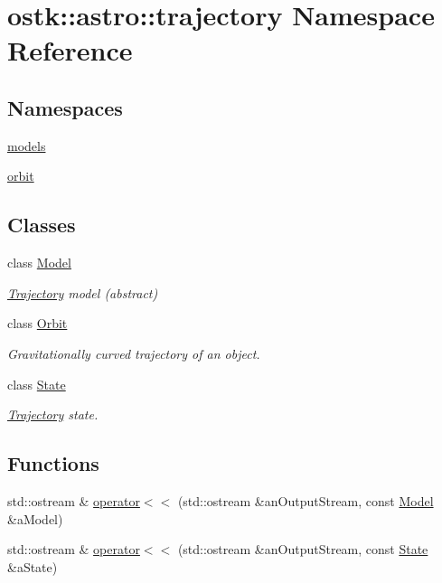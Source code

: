\hypertarget{namespaceostk_1_1astro_1_1trajectory}{}\section{ostk\+:\+:astro\+:\+:trajectory Namespace Reference}
\label{namespaceostk_1_1astro_1_1trajectory}
\subsection*{Namespaces}
\begin{DoxyCompactItemize}
\item 
 \hyperlink{namespaceostk_1_1astro_1_1trajectory_1_1models}{models}
\item 
 \hyperlink{namespaceostk_1_1astro_1_1trajectory_1_1orbit}{orbit}
\end{DoxyCompactItemize}
\subsection*{Classes}
\begin{DoxyCompactItemize}
\item 
class \hyperlink{classostk_1_1astro_1_1trajectory_1_1_model}{Model}
\begin{DoxyCompactList}\small\item\em \hyperlink{classostk_1_1astro_1_1_trajectory}{Trajectory} model (abstract) \end{DoxyCompactList}\item 
class \hyperlink{classostk_1_1astro_1_1trajectory_1_1_orbit}{Orbit}
\begin{DoxyCompactList}\small\item\em Gravitationally curved trajectory of an object. \end{DoxyCompactList}\item 
class \hyperlink{classostk_1_1astro_1_1trajectory_1_1_state}{State}
\begin{DoxyCompactList}\small\item\em \hyperlink{classostk_1_1astro_1_1_trajectory}{Trajectory} state. \end{DoxyCompactList}\end{DoxyCompactItemize}
\subsection*{Functions}
\begin{DoxyCompactItemize}
\item 
std\+::ostream \& \hyperlink{namespaceostk_1_1astro_1_1trajectory_af26a26e9fbf975e9b2a79b7f064ede6b}{operator$<$$<$} (std\+::ostream \&an\+Output\+Stream, const \hyperlink{classostk_1_1astro_1_1trajectory_1_1_model}{Model} \&a\+Model)
\item 
std\+::ostream \& \hyperlink{namespaceostk_1_1astro_1_1trajectory_a995329a575cfbec97abc14f605cf5cfa}{operator$<$$<$} (std\+::ostream \&an\+Output\+Stream, const \hyperlink{classostk_1_1astro_1_1trajectory_1_1_state}{State} \&a\+State)
\end{DoxyCompactItemize}


